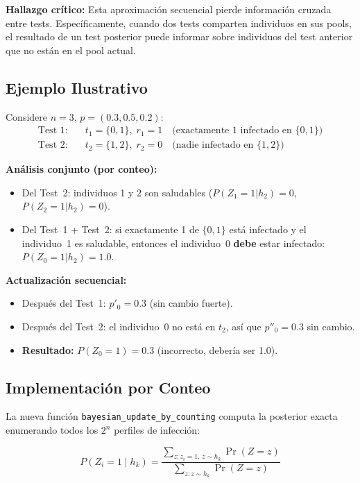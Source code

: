 \documentclass[11pt, a4paper]{article}
\begin{document}
\textbf{Hallazgo cr\'itico:} Esta aproximaci\'on secuencial pierde informaci\'on
cruzada entre tests. Espec\'ificamente, cuando dos tests comparten individuos
en sus pools, el resultado de un test posterior puede informar sobre individuos
del test anterior que no est\'an en el pool actual.

\subsection{Ejemplo Ilustrativo}
Considere $n=3$, $p = (0.3, 0.5, 0.2)$:
\begin{align*}
    \text{Test 1:} &\quad t_1 = \{0, 1\}, \; r_1 = 1 \quad
    \text{(exactamente 1 infectado en $\{0,1\}$)} \\
    \text{Test 2:} &\quad t_2 = \{1, 2\}, \; r_2 = 0 \quad
    \text{(nadie infectado en $\{1,2\}$)}
\end{align*}

\textbf{An\'alisis conjunto (por conteo):}
\begin{itemize}[nosep]
    \item Del Test~2: individuos 1 y 2 son saludables ($P(Z_1=1|h_2) = 0$,
    $P(Z_2=1|h_2) = 0$).
    \item Del Test~1 + Test~2: si exactamente 1 de $\{0,1\}$ est\'a infectado
    y el individuo~1 es saludable, entonces el individuo~0 \textbf{debe} estar
    infectado: $P(Z_0=1|h_2) = 1.0$.
\end{itemize}

\textbf{Actualizaci\'on secuencial:}
\begin{itemize}[nosep]
    \item Despu\'es del Test~1: $p'_0 = 0.3$ (sin cambio fuerte).
    \item Despu\'es del Test~2: el individuo~0 no est\'a en $t_2$, as\'i que
    $p''_0 = 0.3$ sin cambio.
    \item \textbf{Resultado:} $P(Z_0=1) = 0.3$ (incorrecto, deber\'ia ser 1.0).
\end{itemize}

\subsection{Implementaci\'on por Conteo}
La nueva funci\'on \texttt{bayesian\_update\_by\_counting} computa la posterior
exacta enumerando todos los $2^n$ perfiles de infecci\'on:

\begin{equation}
    P(Z_i = 1 \mid h_k) = \frac{
        \sum_{z: z_i=1, \, z \sim h_k} \Pr(Z=z)
    }{
        \sum_{z: z \sim h_k} \Pr(Z=z)
    }
\end{equation}
\end{document}
